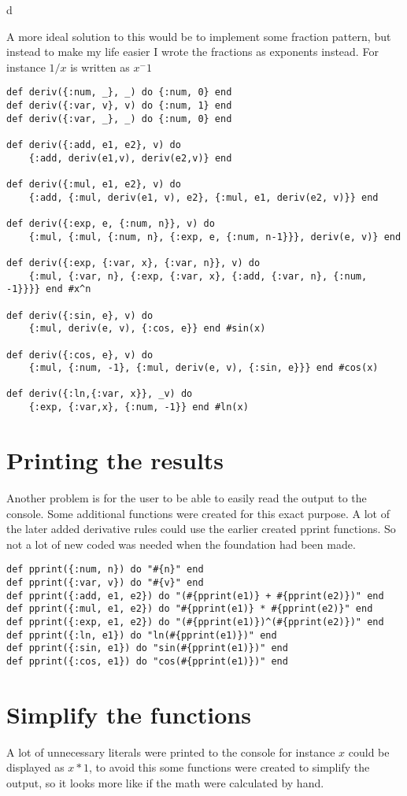 d\documentclass[a4paper,11pt]{article}
\begin{document}
A more ideal solution to this would be to implement some fraction pattern, but instead to make my life easier I wrote the fractions as exponents instead. For instance $1/x$ is written as $x^-1$

\begin{verbatim}
def deriv({:num, _}, _) do {:num, 0} end
def deriv({:var, v}, v) do {:num, 1} end
def deriv({:var, _}, _) do {:num, 0} end

def deriv({:add, e1, e2}, v) do 
    {:add, deriv(e1,v), deriv(e2,v)} end

def deriv({:mul, e1, e2}, v) do 
    {:add, {:mul, deriv(e1, v), e2}, {:mul, e1, deriv(e2, v)}} end

def deriv({:exp, e, {:num, n}}, v) do 
    {:mul, {:mul, {:num, n}, {:exp, e, {:num, n-1}}}, deriv(e, v)} end

def deriv({:exp, {:var, x}, {:var, n}}, v) do 
    {:mul, {:var, n}, {:exp, {:var, x}, {:add, {:var, n}, {:num, -1}}}} end #x^n

def deriv({:sin, e}, v) do 
    {:mul, deriv(e, v), {:cos, e}} end #sin(x)

def deriv({:cos, e}, v) do 
    {:mul, {:num, -1}, {:mul, deriv(e, v), {:sin, e}}} end #cos(x)

def deriv({:ln,{:var, x}}, _v) do 
    {:exp, {:var,x}, {:num, -1}} end #ln(x)
\end{verbatim}

\section{Printing the results}
Another problem is for the user to be able to easily read the output to the console. Some additional functions were created for this exact purpose. A lot of the later added derivative rules could use the earlier created pprint functions. So not a lot of new coded was needed when the foundation had been made.

\begin{verbatim}
def pprint({:num, n}) do "#{n}" end
def pprint({:var, v}) do "#{v}" end
def pprint({:add, e1, e2}) do "(#{pprint(e1)} + #{pprint(e2)})" end
def pprint({:mul, e1, e2}) do "#{pprint(e1)} * #{pprint(e2)}" end
def pprint({:exp, e1, e2}) do "(#{pprint(e1)})^(#{pprint(e2)})" end
def pprint({:ln, e1}) do "ln(#{pprint(e1)})" end
def pprint({:sin, e1}) do "sin(#{pprint(e1)})" end
def pprint({:cos, e1}) do "cos(#{pprint(e1)})" end
\end{verbatim}

\section{Simplify the functions}
A lot of unnecessary literals were printed to the console for instance $x$ could be displayed as $x * 1 $, to avoid this some functions were created to simplify the output, so it looks more like if the math were calculated by hand.
\end{document}
